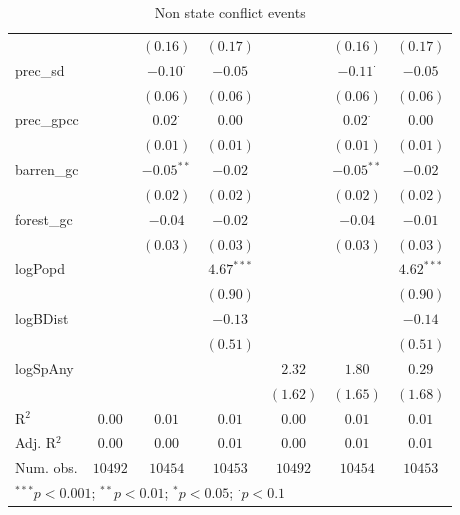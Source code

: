 \begin{sidewaystable}
\begin{center}
{\begin{tabular}{l c c c c c c}
                &                 & $(0.16)$        & $(0.17)$     &               & $(0.16)$        & $(0.17)$     \\
prec\_sd        &                 & $-0.10^{\cdot}$ & $-0.05$      &               & $-0.11^{\cdot}$ & $-0.05$      \\
                &                 & $(0.06)$        & $(0.06)$     &               & $(0.06)$        & $(0.06)$     \\
prec\_gpcc      &                 & $0.02^{\cdot}$  & $0.00$       &               & $0.02^{\cdot}$  & $0.00$       \\
                &                 & $(0.01)$        & $(0.01)$     &               & $(0.01)$        & $(0.01)$     \\
barren\_gc      &                 & $-0.05^{**}$    & $-0.02$      &               & $-0.05^{**}$    & $-0.02$      \\
                &                 & $(0.02)$        & $(0.02)$     &               & $(0.02)$        & $(0.02)$     \\
forest\_gc      &                 & $-0.04$         & $-0.02$      &               & $-0.04$         & $-0.01$      \\
                &                 & $(0.03)$        & $(0.03)$     &               & $(0.03)$        & $(0.03)$     \\
logPopd         &                 &                 & $4.67^{***}$ &               &                 & $4.62^{***}$ \\
                &                 &                 & $(0.90)$     &               &                 & $(0.90)$     \\
logBDist        &                 &                 & $-0.13$      &               &                 & $-0.14$      \\
                &                 &                 & $(0.51)$     &               &                 & $(0.51)$     \\
logSpAny        &                 &                 &              & $2.32$        & $1.80$          & $0.29$       \\
                &                 &                 &              & $(1.62)$      & $(1.65)$        & $(1.68)$     \\
\hline
R$^2$           & $0.00$          & $0.01$          & $0.01$       & $0.00$        & $0.01$          & $0.01$       \\
Adj. R$^2$      & $0.00$          & $0.00$          & $0.01$       & $0.00$        & $0.01$          & $0.01$       \\
Num. obs.       & $10492$         & $10454$         & $10453$      & $10492$       & $10454$         & $10453$      \\
\hline
\multicolumn{7}{l}{\scriptsize{$^{***}p<0.001$; $^{**}p<0.01$; $^{*}p<0.05$; $^{\cdot}p<0.1$}}
\end{tabular}
}
\caption{Non state conflict events}
\label{non_state}
\end{center}
\end{sidewaystable}
